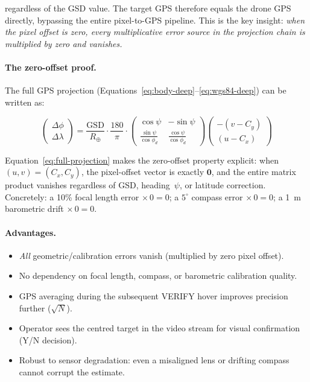 \noindent regardless of the GSD value.  The target GPS therefore equals the drone GPS directly, bypassing the entire pixel-to-GPS pipeline.  This is the key insight: \emph{when the pixel offset is zero, every multiplicative error source in the projection chain is multiplied by zero and vanishes.}

\paragraph{The zero-offset proof.}  The full GPS projection (Equations~\ref{eq:body-deep}--\ref{eq:wgs84-deep}) can be written as:

\begin{equation}\label{eq:full-projection}
  \begin{pmatrix} \Delta\phi \\ \Delta\lambda \end{pmatrix}
  = \frac{\mathrm{GSD}}{R_\oplus} \cdot \frac{180}{\pi} \cdot
  \begin{pmatrix} \cos\psi & -\sin\psi \\ \frac{\sin\psi}{\cos\phi_d} & \frac{\cos\psi}{\cos\phi_d} \end{pmatrix}
  \begin{pmatrix} -(v - C_y) \\ (u - C_x) \end{pmatrix}
\end{equation}

\noindent Equation~\ref{eq:full-projection} makes the zero-offset property explicit: when $(u, v) = (C_x, C_y)$, the pixel-offset vector is exactly $\mathbf{0}$, and the entire matrix product vanishes regardless of GSD, heading~$\psi$, or latitude correction.  Concretely: a 10\% focal length error $\times\,0 = 0$; a $5^{\circ}$ compass error $\times\,0 = 0$; a \SI{1}{\metre} barometric drift $\times\,0 = 0$.

\paragraph{Advantages.}
\begin{itemize}
  \item \emph{All} geometric/calibration errors vanish (multiplied by zero pixel offset).
  \item No dependency on focal length, compass, or barometric calibration quality.
  \item GPS averaging during the subsequent VERIFY hover improves precision further ($\sqrt{N}$).
  \item Operator sees the centred target in the video stream for visual confirmation (Y/N decision).
  \item Robust to sensor degradation: even a misaligned lens or drifting compass cannot corrupt the estimate.
\end{itemize}


